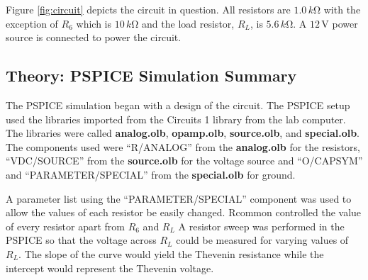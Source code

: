 \documentclass[11pt]{article}
\begin{document}
Figure \ref{fig:circuit} depicts the circuit in question. All resistors are $1.0\,k\si\ohm$ with the exception of $R_6$ which is $10\,k\si\ohm$ and the load resistor, $R_L$, is $5.6\,k\si\ohm$. A $12\,\si\volt$ power source is connected to power the circuit.

%
\subsection{Theory: PSPICE Simulation Summary}

The PSPICE simulation began with a design of the circuit. The PSPICE setup used the libraries imported from the Circuits 1 library from the lab computer. The libraries were called \textbf{analog.olb}, \textbf{opamp.olb}, \textbf{source.olb}, and \textbf{special.olb}. The components used were ``R/ANALOG'' from the \textbf{analog.olb} for the resistors, ``VDC/SOURCE'' from the \textbf{source.olb} for the voltage source and ``O/CAPSYM'' and ``PARAMETER/SPECIAL'' from the \textbf{special.olb} for ground.


A parameter list using the ``PARAMETER/SPECIAL'' component was used to allow the values of each resistor be easily changed. Rcommon controlled the value of every resistor apart from $R_6$ and $R_L$ A resistor sweep was performed in the PSPICE so that the voltage across $R_L$ could be measured for varying values of $R_L$. The slope of the curve would yield the Thevenin resistance while the intercept would represent the Thevenin voltage.
\end{document}
